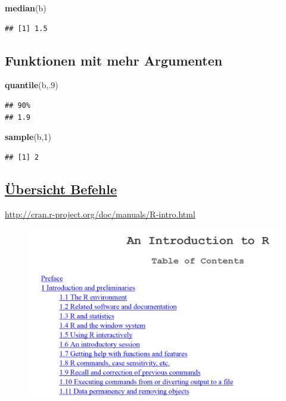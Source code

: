 \documentclass[]{article}
\newenvironment{Shaded}{\begin{snugshade}}{\end{snugshade}}
\newcommand{\KeywordTok}[1]{\textcolor[rgb]{0.13,0.29,0.53}{\textbf{{#1}}}}
\newcommand{\DecValTok}[1]{\textcolor[rgb]{0.00,0.00,0.81}{{#1}}}
\newcommand{\NormalTok}[1]{{#1}}
\begin{document}
\begin{Shaded}
\begin{Highlighting}[]
\KeywordTok{median}\NormalTok{(b)}
\end{Highlighting}
\end{Shaded}

\begin{verbatim}
## [1] 1.5
\end{verbatim}

\subsection{Funktionen mit mehr
Argumenten}\label{funktionen-mit-mehr-argumenten-1}

\begin{Shaded}
\begin{Highlighting}[]
\KeywordTok{quantile}\NormalTok{(b,.}\DecValTok{9}\NormalTok{)}
\end{Highlighting}
\end{Shaded}

\begin{verbatim}
## 90% 
## 1.9
\end{verbatim}

\begin{Shaded}
\begin{Highlighting}[]
\KeywordTok{sample}\NormalTok{(b,}\DecValTok{1}\NormalTok{) }
\end{Highlighting}
\end{Shaded}

\begin{verbatim}
## [1] 2
\end{verbatim}

\subsection{\texorpdfstring{\href{http://cran.r-project.org/doc/manuals/R-intro.html}{Übersicht
Befehle}}{Übersicht Befehle}}\label{ubersicht-befehle}

\url{http://cran.r-project.org/doc/manuals/R-intro.html}

\begin{figure}[htbp]
\centering
\includegraphics{figure/UebersichtBefehle.PNG}
\caption{}
\end{figure}
\end{document}

